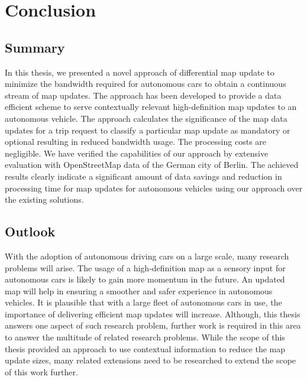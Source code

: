   





\chapter{Conclusion} \label{ch:conclusion}
\section{Summary}
In this thesis, we presented a novel approach of differential map update to minimize the bandwidth required for autonomous cars to obtain a continuous stream of map updates. The approach has been developed to provide a data efficient scheme to serve contextually relevant high-definition map updates to an autonomous vehicle. The approach calculates the significance of the map data updates for a trip request to classify a particular map update as mandatory or optional resulting in reduced bandwidth usage. The processing costs are negligible. We have verified the capabilities of our approach by extensive evaluation with OpenStreetMap data of the German city of Berlin. The achieved results clearly indicate a significant amount of data savings and reduction in processing time for map updates for autonomous vehicles using our approach over the existing solutions.  
\section{Outlook}
With the adoption of autonomous driving cars on a large scale, many research problems will arise. The usage of a high-definition map as a sensory input for autonomous cars is likely to gain more momentum in the future. An updated map will help in ensuring a smoother and safer experience in autonomous vehicles. It is plausible that with a large fleet of autonomous cars in use, the importance of delivering efficient map updates will increase. Although, this thesis answers one aspect of such research problem, further work is required in this area to answer the multitude of related research problems. While the scope of this thesis provided an approach to use contextual information to reduce the map update sizes, many related extensions need to be researched to extend the scope of this work further. 
